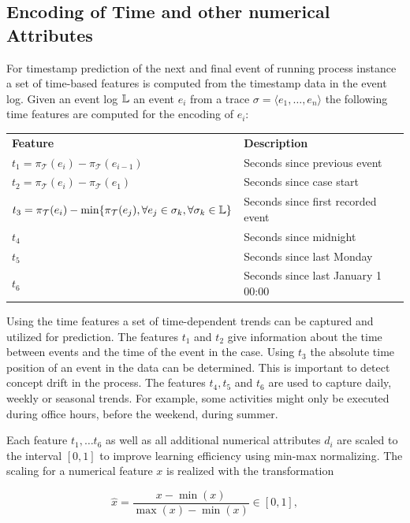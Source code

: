 \subsection{Encoding of Time and other numerical Attributes}

For timestamp prediction of the next and final event of running process instance a set of time-based features is computed from the timestamp data in the event log.
Given an event log $\mathbb{L}$ an event $e_i$ from a trace $\sigma = \langle e_1, \dots, e_n \rangle$ the following time features are computed for the encoding of $e_i$: 

\begin{center}
\begin{tabularx}{\textwidth}{l l}
	\centering
	 \textbf{Feature} & \textbf{Description} \\
	$t_1 = \pi_\mathcal{T}(e_i) - \pi_\mathcal{T}(e_{i-1})$ & Seconds since previous event \\
	$t_2 = \pi_\mathcal{T}(e_i) - \pi_\mathcal{T}(e_1)$ & Seconds since case start \\
	$t_3 = \pi_\mathcal{T}(e_i) - \min\{\pi_\mathcal{T}(e_{j}), \forall e_j \in \sigma_k, \forall  \sigma_k \in \mathbb{L}\}$ & Seconds since first recorded event \\
	$t_4$ & Seconds since midnight \\
	$t_5$ & Seconds since last Monday \\
	$t_6$ & Seconds since last January 1 00:00
\end{tabularx}
\end{center}

Using the time features a set of time-dependent trends can be captured and utilized for prediction.
The features $t_1$ and $t_2$ give information about the time between events and the time of the event in the case.
Using $t_3$ the absolute time position of an event in the data can be determined.
This is important to detect concept drift in the process.
The features $t_4, t_5$ and $t_6$ are used to capture daily, weekly or seasonal trends.
For example, some activities might only be executed during office hours, before the weekend, during summer.

Each feature $t_1, \dots t_6$ as well as all additional numerical attributes $d_i$ are scaled to the interval $ [0, 1]$ to improve learning efficiency using min-max normalizing.
The scaling for a numerical feature $x$ is realized with the transformation

$$\hat{x} = \dfrac{x-\min(x)}{\max(x) - \min(x)} \in [0, 1],$$

